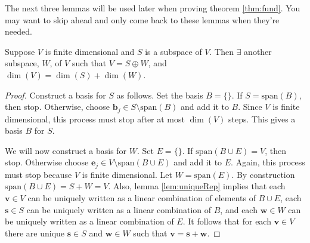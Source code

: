 The next three lemmas will be used later when proving theorem
\ref{thm:fund}. You may want to skip ahead and only come back to these
lemmas when they're needed.
\begin{lemma}\label{lem:directSum}
  Suppose $V$ is finite dimensional and $S$ is a subspace of $V$. Then
  $\exists$ another subspace, $W$, of $V$ such that $V = S \oplus W$,
  and $\dim(V) = \dim(S) + \dim(W)$.
\end{lemma}
\begin{proof}
  Construct a basis for $S$ as follows. Set the basis $B = \{\}$. If
  $S = \text{span}(B)$, then stop. Otherwise, choose $\mathbf{b}_j \in
  S \setminus \text{span}(B)$ and add it to $B$. Since $V$ is finite
  dimensional, this process must stop after at most $\dim(V)$
  steps. This gives a basis $B$ for $S$. 

  We will now construct a basis for $W$. Set $E = \{\}$. If
  $\text{span}(B \cup E) = V$, then stop. Otherwise choose $\mathbf{e}_j \in V
  \setminus \text{span}(B \cup E)$ and add it to $E$. Again, this
  process must stop because $V$ is finite dimensional. Let $W =
  \text{span}(E)$. By construction $\text{span}(B \cup E) = S + W =
  V$. Also, lemma \ref{lem:uniqueRep} implies that each $\mathbf{v}
  \in V$ can be uniquely written as a linear combination of elements
  of $B \cup E$, each $\mathbf{s} \in S$ can be uniquely written as a
  linear combination of $B$, and each $\mathbf{w} \in W$ can be
  uniquely written as a linear combination of $E$. It follows that for
  each $\mathbf{v} \in V$ there are unique $\mathbf{s} \in S$ and
  $\mathbf{w} \in W$ such that $\mathbf{v} = \mathbf{s} +
  \mathbf{w}$. 
\end{proof}

